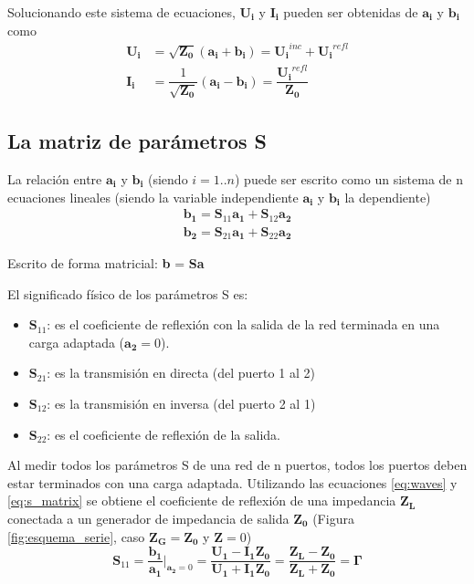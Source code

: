 Solucionando este sistema de ecuaciones, $\bm{U_i}$ y $\bm{I_i}$ pueden ser obtenidas de $\bm{a_i}$ y $\bm{b_i}$ como
\begin{equation}
\begin{aligned}
  \bm{U_i} &= \sqrt{\bm{Z_0}}(\bm{a_i} + \bm{b_i}) = \bm{U_i}^{inc} + \bm{U_i}^{refl}\\
  \bm{I_i} &= \dfrac{1}{\sqrt{\bm{Z_0}}}(\bm{a_i} - \bm{b_i}) = \dfrac{\bm{U_i}^{refl}}{\bm{Z_0}}
\end{aligned}
\end{equation}


\subsection{La matriz de parámetros S}

La relación entre $\bm{a_i}$ y $\bm{b_i}$ (siendo $i=1..n$) puede ser escrito como un sistema de n ecuaciones lineales (siendo la variable independiente $\bm{a_i}$ y $\bm{b_i}$ la dependiente)
\begin{equation}
\begin{aligned}
  \bm{b_1} = \bm{S}_{11}\bm{a_1} + \bm{S}_{12}\bm{a_2} \\
  \bm{b_2} = \bm{S}_{21}\bm{a_1} + \bm{S}_{22}\bm{a_2}
\end{aligned}
\label{eq:s_matrix}
\end{equation}

Escrito de forma matricial: \textbf{b} = \textbf{Sa}

El significado físico de los parámetros S es:
\begin{itemize}
  \item $\bm{S}_{11}$: es el coeficiente de reflexión con la salida de la red terminada en una carga adaptada ($\bm{a_2} = 0$).
  \item $\bm{S}_{21}$: es la transmisión en directa (del puerto 1 al 2)
  \item $\bm{S}_{12}$: es la transmisión en inversa (del puerto 2 al 1)
  \item $\bm{S}_{22}$: es el coeficiente de reflexión de la salida.
\end{itemize}

Al medir todos los parámetros S de una red de n puertos, todos los puertos deben estar terminados con una carga adaptada. Utilizando las ecuaciones \ref{eq:waves} y \ref{eq:s_matrix} se obtiene el coeficiente de reflexión de una impedancia $\bm{Z_L}$ conectada a un generador de impedancia de salida $\bm{Z_0}$ (Figura \ref{fig:esquema_serie}, caso $\bm{Z_G} = \bm{Z_0}$ y $\bm{Z} = 0$)
\begin{equation}
\bm{S}_{11} = \dfrac{\bm{b_1}}{\bm{a_1}}\bigg|_{\bm{a_2}=0} = \dfrac{\bm{U_1} - \bm{I_1}\bm{Z_0}}{\bm{U_1} + \bm{I_1}\bm{Z_0}} = \dfrac{\bm{Z_L} - \bm{Z_0}}{\bm{Z_L} + \bm{Z_0}} = \bm{\Gamma}
\end{equation}

